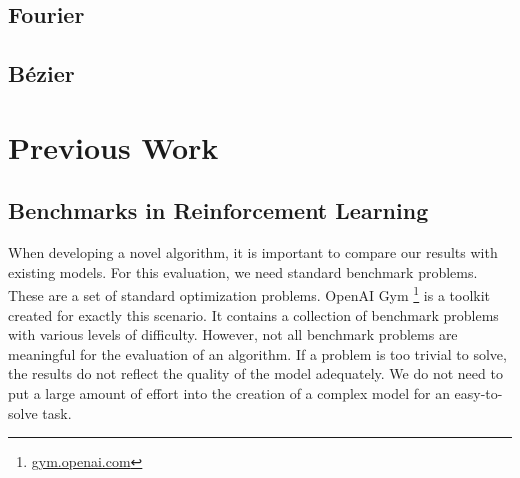\subsection{Fourier}

\subsection{Bézier}


\section{Previous Work}

\subsection{Benchmarks in Reinforcement Learning}
When developing a novel algorithm, it is important to compare our results with existing models. For this evaluation, we need standard benchmark problems. These are a set of standard optimization problems. OpenAI Gym \footnote{\url{gym.openai.com}} is a toolkit created for exactly this scenario. It contains a collection of benchmark problems with various levels of difficulty. However, not all benchmark problems are meaningful for the evaluation of an algorithm. If a problem is too trivial to solve, the results do not reflect the quality of the model adequately. We do not need to put a large amount of effort into the creation of a complex model for an easy-to-solve task.

